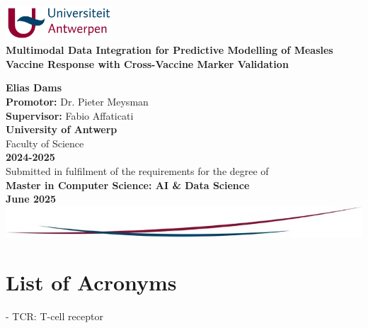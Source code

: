 \documentclass[12pt,a4paper]{report}
\begin{document}
\begin{titlepage}
    \centering

    \includegraphics[width=0.3\textwidth]{images/uantwerpen_logo.jpg}\\[1cm]

    {\Huge \textbf{Multimodal Data Integration for Predictive Modelling of Measles Vaccine Response with Cross-Vaccine Marker Validation}} \\
    \vfill

    {\Large \textbf{Elias Dams}}\\[1cm]

    \textbf{Promotor:} Dr. Pieter Meysman\\
    \textbf{Supervisor:} Fabio Affaticati\\[1.5cm]

    {\Large \textbf{University of Antwerp}}\\
    {\large Faculty of Science}\\[0.5cm]

    \textbf{2024-2025}\\[1.5cm]

    Submitted in fulfilment of the requirements for the degree of\\
    \textbf{Master in Computer Science: AI \& Data Science}\\[1cm]

    \textbf{June 2025}\\[2cm]

    \vfill
    \includegraphics[width=1.0\textwidth]{images/bottom_design.jpg}

\end{titlepage}


\tableofcontents
\newpage

\listoffigures

\listoftables

\chapter*{List of Acronyms}
- TCR: T-cell receptor
\end{document}
